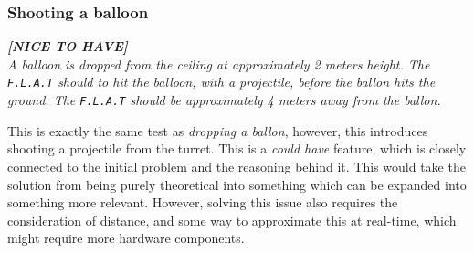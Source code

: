 \subsubsection{Shooting a balloon}
\textit{\textbf{[NICE TO HAVE]}}\\
\textit{A balloon is dropped from the ceiling at approximately 2 meters height.	
The \texttt{F.L.A.T} should to hit the balloon, with a projectile, before the ballon hits the ground.
The \texttt{F.L.A.T} should be approximately 4 meters away from the ballon.}

This is exactly the same test as \textit{dropping a ballon}, however, this introduces shooting a projectile from the turret.
This is a \textit{could have} feature, which is closely connected to the initial problem and the reasoning behind it.
This would take the solution from being purely theoretical into something which can be expanded into something more relevant.
However, solving this issue also requires the consideration of distance, and some way to approximate this at real-time, which might require more hardware components.